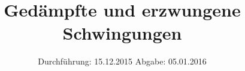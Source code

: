 
\usepackage[frak=boondox]{mathalfa}
\subject{354}
\title{Gedämpfte und erzwungene Schwingungen}
\date{
  Durchführung: 15.12.2015
  \hspace{3em}
  Abgabe: 05.01.2016
}



\maketitle
\newpage
\mbox{}
\newpage
\thispagestyle{empty}
\tableofcontents
\newpage






\nocite{numpy}
\nocite{matplotlib}
\nocite{uncertainties}
\printbibliography


